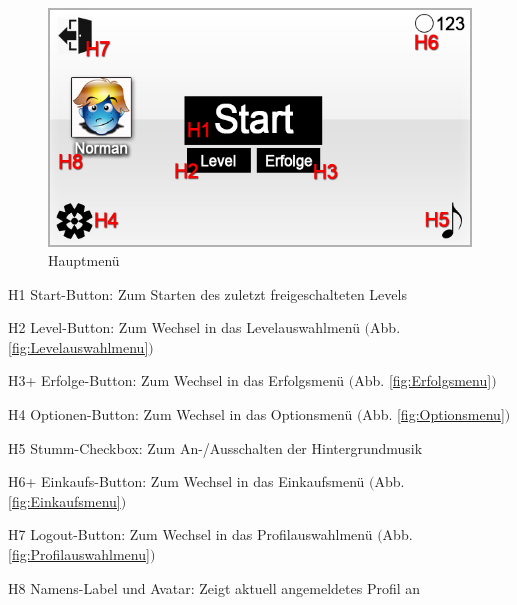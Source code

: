 \begin{figure}[H]
\centering
\includegraphics[scale=0.55]{../gui/_jpeg_numeration/main_manu.jpg}
\caption{Hauptmenü}
\label{fig:Hauptmenu}
\end{figure}
\begin{description*}
\item[H1] Start-Button: Zum Starten des zuletzt freigeschalteten Levels
\item[H2] Level-Button: Zum Wechsel in das Levelauswahlmenü $($Abb. \ref{fig:Levelauswahlmenu}$)$
\item[H3+] Erfolge-Button: Zum Wechsel in das Erfolgsmenü $($Abb. \ref{fig:Erfolgsmenu}$)$
\item[H4] Optionen-Button: Zum Wechsel in das Optionsmenü $($Abb. \ref{fig:Optionsmenu}$)$
\item[H5] Stumm-Checkbox: Zum An-/Ausschalten der Hintergrundmusik
\item[H6+] Einkaufs-Button: Zum Wechsel in das Einkaufsmenü $($Abb. \ref{fig:Einkaufsmenu}$)$
\item[H7] Logout-Button: Zum Wechsel in das Profilauswahlmenü $($Abb. \ref{fig:Profilauswahlmenu}$)$
\item[H8] Namens-Label und Avatar: Zeigt aktuell angemeldetes Profil an
\end{description*}


